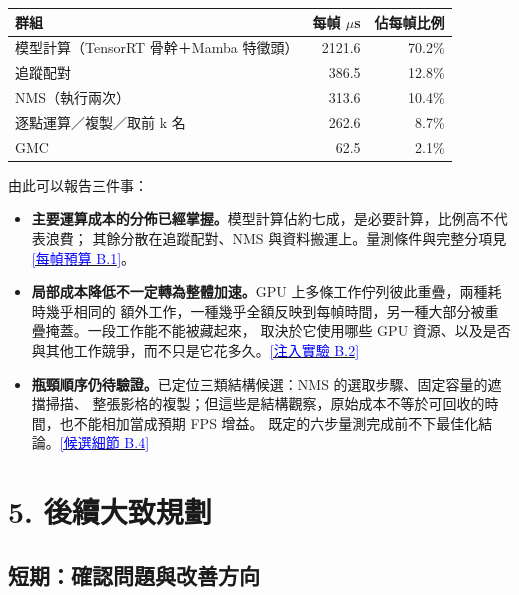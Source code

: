 \documentclass[10pt,a4paper]{ctexart}
\newcommand{\applink}[2]{\hyperref[#1]{\textcolor{Blue}{[#2]}}}
\newcommand{\tighttable}{\small\setlength{\tabcolsep}{4pt}}
\begin{document}
\tighttable
\begin{tabularx}{\linewidth}{@{}Yrr@{}}
\toprule
群組 & 每幀 $\mu$s & 佔每幀比例\\
\midrule
模型計算（TensorRT 骨幹＋Mamba 特徵頭） & 2121.6 & 70.2\%\\
追蹤配對 & 386.5 & 12.8\%\\
NMS（執行兩次） & 313.6 & 10.4\%\\
逐點運算／複製／取前 k 名 & 262.6 & 8.7\%\\
GMC & 62.5 & 2.1\%\\
\bottomrule
\end{tabularx}

由此可以報告三件事：

\begin{itemize}
  \item \textbf{主要運算成本的分佈已經掌握。}模型計算佔約七成，是必要計算，比例高不代表浪費；
  其餘分散在追蹤配對、NMS 與資料搬運上。量測條件與完整分項見 \applink{app:B1}{每幀預算 B.1}。
  \item \textbf{局部成本降低不一定轉為整體加速。}GPU 上多條工作佇列彼此重疊，兩種耗時幾乎相同的
  額外工作，一種幾乎全額反映到每幀時間，另一種大部分被重疊掩蓋。一段工作能不能被藏起來，
  取決於它使用哪些 GPU 資源、以及是否與其他工作競爭，而不只是它花多久。\applink{app:B2}{注入實驗 B.2}
  \item \textbf{瓶頸順序仍待驗證。}已定位三類結構候選：NMS 的選取步驟、固定容量的遮擋掃描、
  整張影格的複製；但這些是結構觀察，原始成本不等於可回收的時間，也不能相加當成預期 FPS 增益。
  既定的六步量測完成前不下最佳化結論。\applink{app:B4}{候選細節 B.4}
\end{itemize}

\vfill

\newpage

\section{5. 後續大致規劃}

\subsection{短期：確認問題與改善方向}
\end{document}
